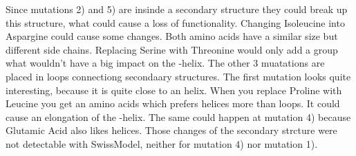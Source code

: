 \documentclass[]{article}
\begin{document}
\noindent Since mutations 2) and 5) are insinde a secondary structure they could break up this structure, what could cause a loss of functionality. \newline
Changing Isoleucine into Aspargine could cause some changes. Both amino acids have a similar size but different side chains. \newline
Replacing Serine with Threonine would only add a  group what wouldn't have a big impact on the \ce{\alpha}-helix.\newline
The other 3 muatations are placed in loops connectiong secondaary structures. The first mutation looks quite interesting, because it is quite close to an helix. When you replace Proline with Leucine you get an amino acids which prefers helices more than loops. It could cause an elongation of the \ce{\alpha}-helix. \newline
The same could happen at mutation 4) because Glutamic Acid also likes helices.\newline
\newline
Those changes of the secondary strcture were not detectable with SwissModel, neither for mutation 4) nor mutation 1). 
\end{document}
